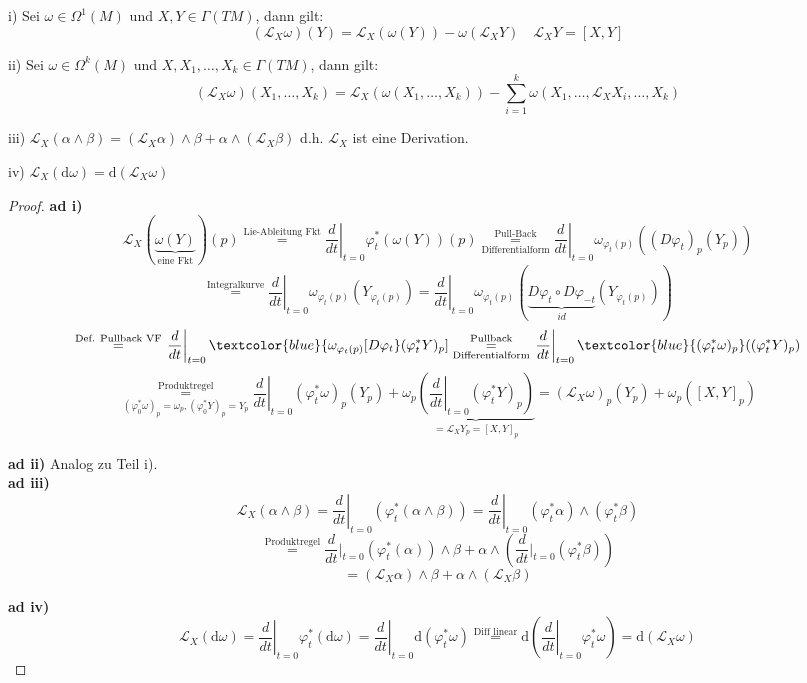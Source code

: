 \documentclass[fleqn, 12pt, letterpaper]{article}
\newcommand{\txt}[1]{\text{#1}}
\begin{document}
i) Sei \( \omega \in \Omega^1(M) \) und \( X, Y \in \Gamma(TM) \), dann gilt:
\[
(\mathcal{L}_X \omega)(Y) = \mathcal{L}_X(\omega(Y)) - \omega(\mathcal{L}_XY) \quad \mathcal{L}_XY = [X,Y]
\]

ii) Sei \( \omega \in \Omega^k(M) \) und \( X, X_1, \dots, X_k \in \Gamma(TM) \), dann gilt:
\[
(\mathcal{L}_X \omega)(X_1, \dots, X_k) = \mathcal{L}_X(\omega(X_1, \dots, X_k)) - \sum_{i=1}^k \omega(X_1, \dots, \mathcal{L}_XX_i, \dots, X_k)
\]

iii) 
\(
\mathcal{L}_X (\alpha \wedge \beta) = (\mathcal{L}_X \alpha) \wedge \beta + \alpha \wedge (\mathcal{L}_X \beta)
\)
d.h. $\mathcal{L}_X$ ist eine Derivation.

iv)
\(
\mathcal{L}_X (\mathrm{d} \omega )= \mathrm{d} (\mathcal{L}_X \omega)
\)

\begin{proof}
\textbf{ad i)}
\[
\mathcal{L}_X(\underbrace{\omega(Y)}_{\txt{eine Fkt}})(p) 
\overset{\txt{Lie-Ableitung Fkt}}{=} \left.\frac{d}{dt}\right|_{t=0} \varphi_t^*(\omega(Y)) (p) 
\underset{\txt{Differentialform}}{\overset{\txt{Pull-Back}}{=}} \left.\frac{d}{dt}\right|_{t=0} \omega_{\varphi_t(p)} \left( (D\varphi_t)_p (Y_p) \right)
\]
\[
\overset{\txt{Integralkurve}}{=} \left.\frac{d}{dt}\right|_{t=0} \omega_{\varphi_t(p)} \left( Y_{\varphi_t(p)} \right)
= \left.\frac{d}{dt}\right|_{t=0} \omega_{\varphi_t(p)} \left( \underbrace{D\varphi_t \circ D\varphi_{-t}}_{id} (Y_{\varphi_t(p)}) \right)
\]
\[
\overset{\txt{Def. Pullback VF}}{=} \left.\frac{d}{dt}\right|_{t=0} \textcolor{blue}{\omega_{\varphi_t(p)} [D\varphi_t}(\varphi_t^* Y)_p] \underset{\txt{Differentialform}}{\overset{\txt{Pullback}}{=}} \left.\frac{d}{dt}\right|_{t=0} \textcolor{blue}{(\varphi_t^*\omega)_p}((\varphi_t^* Y)_p)
\]
\[
\underset{(\varphi_0^*\omega)_p=\omega_p, (\varphi_0^*Y)_p=Y_p}{\overset{\txt{Produktregel}}{=}} \left.\frac{d}{dt}\right|_{t=0} (\varphi_t^* \omega)_p (Y_p)
+ \omega_p \underbrace{\left( \left.\frac{d}{dt}\right|_{t=0} (\varphi_t^* Y)_p \right)}_{=\mathcal{L}_XY_p=[X,Y]_p} = (\mathcal{L}_X \omega)_p (Y_p) + \omega_p([X,Y]_p)
\]

\textbf{ad ii)} \quad Analog zu Teil i).\\

\textbf{ad iii)} 
\[
\mathcal{L}_X(\alpha \wedge \beta) 
= \left. \frac{d}{dt} \right|_{t=0} (\varphi_t^* (\alpha \wedge \beta)) 
= \left. \frac{d}{dt} \right|_{t=0} (\varphi_t^* \alpha) \wedge (\varphi_t^* \beta)
\]
\[\overset{\txt{Produktregel}}{=}\frac{d}{dt} |_{t=0} (\varphi_t^* (\alpha ))\wedge\beta+\alpha\wedge(\frac{d}{dt} |_{t=0} (\varphi_t^* \beta))\]
\[
= (\mathcal{L}_X \alpha) \wedge \beta + \alpha \wedge (\mathcal{L}_X \beta)
\]

\textbf{ad iv)}
\[
\mathcal{L}_X (\mathrm{d} \omega) 
= \left. \frac{d}{dt} \right|_{t=0} \varphi_t^* (\mathrm{d} \omega) 
= \left. \frac{d}{dt} \right|_{t=0} \mathrm{d}(\varphi_t^* \omega)
\overset{\txt{Diff linear}}{=} \mathrm{d} \left( \left. \frac{d}{dt} \right|_{t=0} \varphi_t^* \omega \right) 
= \mathrm{d} (\mathcal{L}_X \omega)
\]
\end{proof}
\end{document}
